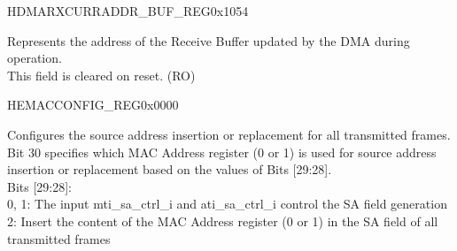 \begin{register}{H}{DMARXCURRADDR\_BUF\_REG}{0x1054}\label{regdesc:DMARXCURRADDRBUFREG}
%
\regnewline%
\begin{regdesc}\begin{reglist}
\item [RECV\_BUFF\_ADDR\_PTR] Represents the address of the Receive Buffer updated by the DMA during operation.\\
This field is cleared on reset. (RO)
\end{reglist}\end{regdesc}
\end{register}



\begin{register}{H}{EMACCONFIG\_REG}{0x0000}\label{regdesc:EMACCONFIGREG}
%
%
%
%
%
%
%
%
%
%
%
%
%
%
%
%
%
%
%
%
%
%
%
%
%
%
\regnewline%
\begin{regdesc}\begin{reglist}
\item [SAIRC] Configures the source address insertion or replacement for all transmitted frames.\\
Bit 30 specifies which MAC Address register (0 or 1) is used for source address insertion or replacement based on the values of Bits [29:28].\\
Bits [29:28]:\\
0, 1: The input mti\_sa\_ctrl\_i and ati\_sa\_ctrl\_i control the SA field generation\\
2: Insert the content of the MAC Address register (0 or 1) in the SA field of all transmitted frames\\

\end{reglist}
\end{regdesc}
\end{register}
